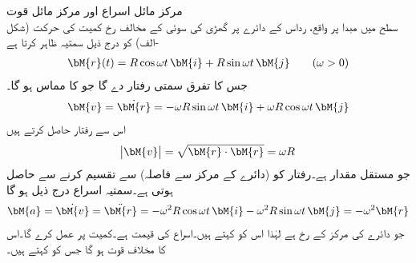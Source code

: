 \quad مرکز مائل اسراع اور مرکز مائل قوت\\
 سطح میں مبدا پر واقع، رداس  کے دائرے  پر گھڑی کی سوئی کے مخالف رخ کمیت  کی حرکت (شکل -الف)  کو درج ذیل سمتیہ ظاہر کرتا ہے
\begin{align*}
\bM{r}(t)=R\cos \omega t\,\bM{i}+R\sin \omega t\,\bM{j}\quad \quad (\omega >0)
\end{align*}
جس کا تفرق سمتی رفتار دے گا جو  کا مماس ہو گا۔
\begin{align*}
\bM{v}=\dot{\bM{r}}=-\omega R\sin \omega t\,\bM{i}+\omega R\cos \omega t \,\bM{j}
\end{align*}
اس سے رفتار حاصل کرتے ہیں 
\begin{align*}
\abs{\bM{v}}=\sqrt{\bM{r}\cdot \bM{r}}=\omega R
\end{align*}
جو مستقل  مقدار ہے۔رفتار کو (دائرے کے مرکز سے فاصلہ)  سے تقسیم کرنے سے   حاصل ہوتی ہے۔سمتیہ اسراع درج ذیل ہو گا
\begin{align}\label{مساوات_الاحصاء_اسراع_رفتار_حرکت}
\bM{a}=\dot{\bM{v}}=\ddot{\bM{r}}=-\omega^2R\cos \omega t\,\bM{i}-\omega^2R\sin \omega t\,\bM{j}=-\omega^2\bM{r}
\end{align}
جو دائرے کی مرکز کے رخ ہے لہٰذا اس کو  کہتے ہیں۔اسراع کی قیمت  ہے۔کمیت  پر   عمل کرے گا۔اس کا مخلاف قوت  ہو گا جس کو  کہتے ہیں۔
